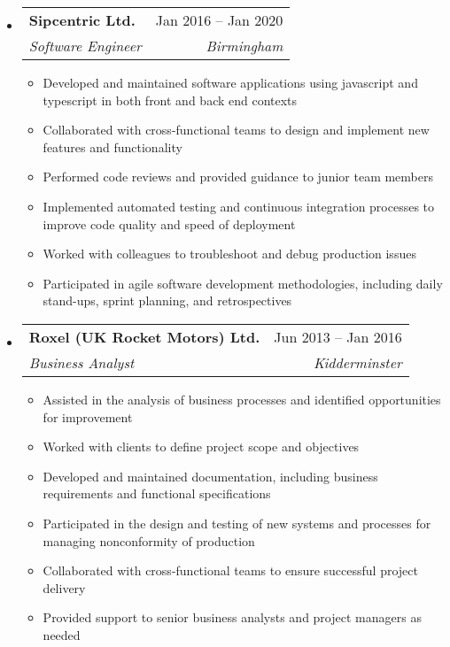 \documentclass[a4paper,12pt]{article}[leftmargin=*]
\makeatletter
\def \entryspacing {-0pt}
\renewcommand{\section}[2]{\vspace{5pt}
  \colorbox{secondary}{\color{white}\raggedbottom\normalsize\textbf{{#1}{\hspace{7pt}#2}}}
}
\newcommand{\resumeEntryStart}{\begin{itemize}[leftmargin=2.5mm]}
\newcommand{\resumeEntryEnd}{\end{itemize}\vspace{\entryspacing}}
\newcommand{\resumeItemListStart}{\begin{itemize}[leftmargin=4.5mm]}
\newcommand{\resumeItemListEnd}{\end{itemize}}
\newcommand{\resumeItem}[1]{
  \item\small{
    {#1 \vspace{-2pt}}
  }
}
\newcommand{\resumeEntryTSDL}[4]{
  \vspace{-1pt}\item[]
    \begin{tabularx}{0.97\textwidth}{X@{\hspace{60pt}}r}
      \textbf{\color{primary}#1} & {\firabook\color{accent}\small#2} \\
      \textit{\color{accent}\small#3} & \textit{\color{accent}\small#4} \\
    \end{tabularx}\vspace{-6pt}
}
\newcommand{\resumeEntryS}[1]{
  \item[]\small{
    \textbf{\color{primary}#1 }{ #2 \vspace{-6pt}}
  }
}
\makeatother
\begin{document}
  \resumeEntryStart
    \resumeEntryTSDL
      {Sipcentric Ltd.}{Jan 2016 -- Jan 2020}
      {Software Engineer}{Birmingham}
    \resumeItemListStart
      \resumeItem {Developed and maintained software applications using javascript and typescript in both front and back end contexts}
      \resumeItem {Collaborated with cross-functional teams to design and implement new features and functionality}
      \resumeItem {Performed code reviews and provided guidance to junior team members}
      \resumeItem {Implemented automated testing and continuous integration processes to improve code quality and speed of deployment}
      \resumeItem {Worked with colleagues to troubleshoot and debug production issues}
      \resumeItem {Participated in agile software development methodologies, including daily stand-ups, sprint planning, and retrospectives}
    \resumeItemListEnd
  \resumeEntryEnd

  \resumeEntryStart
    \resumeEntryTSDL
      {Roxel (UK Rocket Motors) Ltd.}{Jun 2013 -- Jan 2016}
      {Business Analyst}{Kidderminster}
    \resumeItemListStart
        \resumeItem {Assisted in the analysis of business processes and identified opportunities for improvement}
        \resumeItem {Worked with clients to define project scope and objectives}
        \resumeItem {Developed and maintained documentation, including business requirements and functional specifications}
        \resumeItem {Participated in the design and testing of new systems and processes for managing nonconformity of production}
        \resumeItem {Collaborated with cross-functional teams to ensure successful project delivery}
        \resumeItem {Provided support to senior business analysts and project managers as needed}
    \resumeItemListEnd
  \resumeEntryEnd

\end{document}
